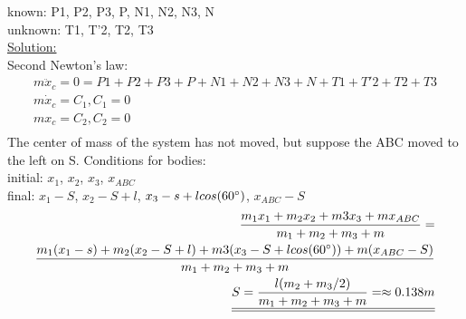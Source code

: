 \documentclass[a4paper,11pt,oneside,article]{memoir}
\def\doubleunderline#1{\underline{\underline{#1}}}
\begin{document}
known: P1, P2, P3, P, N1, N2, N3, N\\
unknown: T1, T'2, T2, T3\\
\underline{Solution:}\\
Second Newton's law: 
\begin{equation}
    \begin{split}
        m\ddot x_c = 0 = P1 + P2 + P3+  P+ N1+ N2+ N3+ N +T1+ T'2+ T2+ T3 \\ 
        m\dot x_c = C_1, C_1 = 0\\
        mx_c = C_2, C_2 = 0\\
    \end{split}
\end{equation}
The center of mass of the system has not moved, but suppose the ABC moved to the left on S. 
Conditions for bodies:\\
initial: $x_1$, $x_2$, $x_3$, $x_{ABC}$\\
final: $x_1-S$, $x_2-S+l$, $x_3-s + lcos(60\degree)$, $x_{ABC}-S$\\
\begin{equation}
    \begin{split}
        \frac{m_1x_1 + m_2x_2+m3x_3+mx_{ABC}}{m_1+m_2+m_3+m} = \\\frac{m_1(x_1-s) + m_2(x_2-S+l)+m3(x_3-S+lcos(60\degree))+m(x_{ABC}-S)}{m_1+m_2+m_3+m}\\ 
        \doubleunderline{S = \frac{l(m_2 + m_3/2)}{m_1+m_2+m_3+m} = \approx 0.138 m}\\
    \end{split}
\end{equation}
\end{document}
